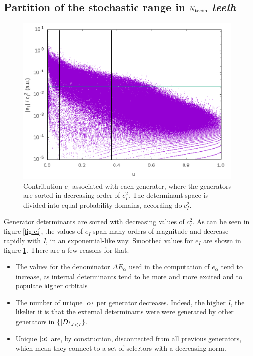 \documentclass[./thesis.tex]{subfiles}
\begin{document}
\subsection{Partition of the stochastic range in $N_\text{teeth}$ \emph{teeth}}
\label{sec:partition}

\begin{figure}[h!]
	\begin{center}
		\includegraphics[width=0.7\columnwidth]{figures/pt2/eici2comb}
	\end{center}
	\caption{Contribution $e_I$ associated with each generator, where the generators are sorted in decreasing order of $c_I^2$. The determinant space is divided into equal probability domains, according do $c_I^2$.}
	\label{fig:p_i}
\end{figure}

Generator determinants are sorted with decreasing values of $c_I^2$.
As can be seen in figure \ref{fig:ei}, the values of $e_I$ span many orders of magnitude and decrease rapidly with $I$, in an exponential-like way. Smoothed values for $e_I$ are shown in figure \ref{fig:p_i}. There are a few reasons for that.
\begin{itemize}
	\item
	The values for the denominator $\Delta E_\alpha$ used in the computation of $e_\alpha$ tend to increase, as internal determinants tend to be more and more excited and to populate higher orbitals 
	\item
	The number of unique $\ket \alpha$ per generator decreases. Indeed, the higher $I$, the likelier it is that the external determinants were were generated by other generators in $\{\ket{D}_{J<I}\}$.
	\item
	Unique $\ket \alpha$ are, by construction, disconnected from all previous generators, which mean they connect to a set of selectors with a decreasing norm.
\end{itemize}
\end{document}

